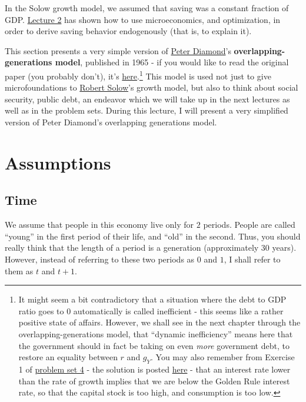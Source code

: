 \documentclass[]{book}
\let\rmarkdownfootnote\footnote%
\def\footnote{\protect\rmarkdownfootnote}
\theoremstyle{definition}
\theoremstyle{definition}
\theoremstyle{definition}
\theoremstyle{remark}
\begin{document}
In the Solow growth model, we assumed that saving was a constant
fraction of GDP. \protect\hyperlink{solow}{Lecture 2} has shown how to
use microeconomics, and optimization, in order to derive saving behavior
endogenously (that is, to explain it).

This section presents a very simple version of
\href{https://en.wikipedia.org/wiki/Peter_Diamond}{Peter Diamond}'s
\textbf{overlapping-generations model}, published in 1965 - if you would
like to read the original paper (you probably don't), it's
\href{https://www.jstor.org/stable/1809231}{here}.\footnote{It might
  seem a bit contradictory that a situation where the debt to GDP ratio
  goes to 0 automatically is called inefficient - this seems like a
  rather positive state of affairs. However, we shall see in the next
  chapter through the overlapping-generations model, that ``dynamic
  inefficiency'' means here that the government should in fact be taking
  on even \emph{more} government debt, to restore an equality between
  \(r\) and \(g_Y\). You may also remember from Exercise 1 of
  \href{pset4.html}{problem set 4} - the solution is posted
  \href{pset4-sol.html}{here} - that an interest rate lower than the
  rate of growth implies that we are below the Golden Rule interest
  rate, so that the capital stock is too high, and consumption is too
  low.} This model is used not just to give microfoundations to
\href{https://en.wikipedia.org/wiki/Robert_Solow}{Robert Solow}'s growth
model, but also to think about social security, public debt, an endeavor
which we will take up in the next lectures as well as in the problem
sets. During this lecture, I will present a very simplified version of
Peter Diamond's overlapping generations model.

\section{Assumptions}\label{assumptions-2}

\subsection{Time}\label{time}

We assume that people in this economy live only for \(2\) periods.
People are called ``young'' in the first period of their life, and
``old'' in the second. Thus, you should really think that the length of
a period is a generation (approximately 30 years). However, instead of
referring to these two periods as \(0\) and \(1\), I shall refer to them
as \(t\) and \(t+1\).
\end{document}
